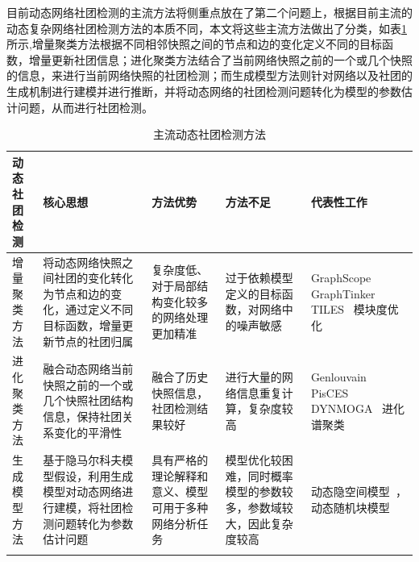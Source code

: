 目前动态网络社团检测的主流方法将侧重点放在了第二个问题上，根据目前主流的动态复杂网络社团检测方法的本质不同，本文将这些主流方法做出了分类，如表\ref{tab.2.1}所示,增量聚类方法根据不同相邻快照之间的节点和边的变化定义不同的目标函数，增量更新社团信息；进化聚类方法结合了当前网络快照之前的一个或几个快照的信息，来进行当前网络快照的社团检测；而生成模型方法则针对网络以及社团的生成机制进行建模并进行推断，并将动态网络的社团检测问题转化为模型的参数估计问题，从而进行社团检测。
\begin{table}[!htbp]
	\centering
	\caption{主流动态社团检测方法}
	\begin{tabular}[width=\textwidth]{lp{3cm}p{2.5cm}p{2.5cm}p{2cm}}
		\hline
		动态社团检测&核心思想&方法优势&方法不足&代表性工作\\
		\hline  %
		增量聚类方法&将动态网络快照之间社团的变化转化为节点和边的变化，通过定义不同目标函数，增量更新节点的社团归属&复杂度低、对于局部结构变化较多的网络处理更加精准&过于依赖模型定义的目标函数，对网络中的噪声敏感&GraphScope~\cite{sun2007graphscope} GraphTinker~\cite{jaiyeoba2019graphtinker} TILES~\cite{rossetti2017tiles} 模块度优化~\cite{lyf2015} \\
		进化聚类方法&融合动态网络当前快照之前的一个或几个快照社团结构信息，保持社团关系变化的平滑性&融合了历史快照信息，社团检测结果较好&进行大量的网络信息重复计算，复杂度较高&Genlouvain~\cite{jutla2011generalized} PisCES~\cite{liu2018global} DYNMOGA~\cite{folino2014evolutionary} 进化谱聚类~\cite{huang2019community}\\
		生成模型方法&基于隐马尔科夫模型假设，利用生成模型对动态网络进行建模，将社团检测问题转化为参数估计问题&具有严格的理论解释和意义、模型可用于多种网络分析任务&模型优化较困难，同时概率模型的参数较多，参数域较大，因此复杂度较高&动态隐空间模型~\cite{sewell2017latent,yang2015a}，动态随机块模型~\cite{yang2011detecting,pensky2017spectral,wu2019dynamic}\\
		\hline %
		
		\label{tab.2.1}
	\end{tabular}
	
\end{table}

